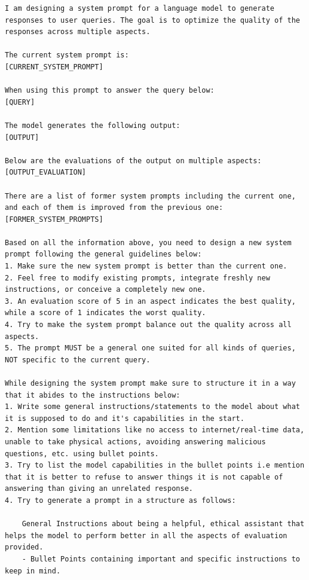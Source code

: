 \begin{lstlisting}[breaklines=true,breakatwhitespace=true]
I am designing a system prompt for a language model to generate responses to user queries. The goal is to optimize the quality of the responses across multiple aspects.

The current system prompt is:
[CURRENT_SYSTEM_PROMPT]

When using this prompt to answer the query below:
[QUERY]

The model generates the following output:
[OUTPUT]

Below are the evaluations of the output on multiple aspects:
[OUTPUT_EVALUATION]

There are a list of former system prompts including the current one, and each of them is improved from the previous one:
[FORMER_SYSTEM_PROMPTS]

Based on all the information above, you need to design a new system prompt following the general guidelines below:
1. Make sure the new system prompt is better than the current one.
2. Feel free to modify existing prompts, integrate freshly new instructions, or conceive a completely new one.
3. An evaluation score of 5 in an aspect indicates the best quality, while a score of 1 indicates the worst quality.
4. Try to make the system prompt balance out the quality across all aspects.
5. The prompt MUST be a general one suited for all kinds of queries, NOT specific to the current query.

While designing the system prompt make sure to structure it in a way that it abides to the instructions below:
1. Write some general instructions/statements to the model about what it is supposed to do and it's capabilities in the start.
2. Mention some limitations like no access to internet/real-time data, unable to take physical actions, avoiding answering malicious questions, etc. using bullet points. 
3. Try to list the model capabilities in the bullet points i.e mention that it is better to refuse to answer things it is not capable of answering than giving an unrelated response.
4. Try to generate a prompt in a structure as follows:

    General Instructions about being a helpful, ethical assistant that helps the model to perform better in all the aspects of evaluation provided.
    - Bullet Points containing important and specific instructions to keep in mind.


\end{lstlisting}
